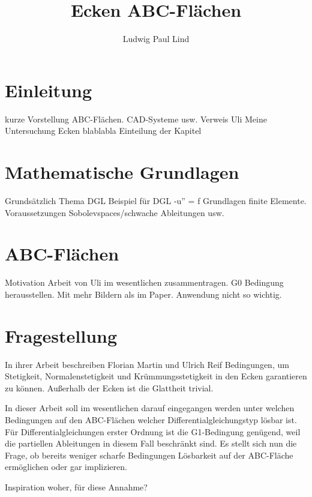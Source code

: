 \documentclass[10pt,a4paper,oneside]{report}
\author{Ludwig Paul Lind}
\title{Ecken ABC-Flächen}
\begin{document}
\maketitle
\tableofcontents

\chapter{Einleitung}
kurze Vorstellung ABC-Flächen. CAD-Systeme usw. 
Verweis Uli
Meine Untersuchung Ecken blablabla
Einteilung der Kapitel

\chapter{Mathematische Grundlagen}
Grundsätzlich Thema DGL
Beispiel für DGL -u'' = f
Grundlagen finite Elemente.
Voraussetzungen
Sobolevspaces/schwache Ableitungen usw.

\chapter{ABC-Flächen}
Motivation
Arbeit von Uli im wesentlichen zusammentragen.
G0 Bedingung herausstellen. 
Mit mehr Bildern als im Paper.
Anwendung nicht so wichtig.

\chapter{Fragestellung}
In ihrer Arbeit beschreiben Florian Martin und Ulrich Reif Bedingungen, um Stetigkeit, Normalenstetigkeit und Krümmungsstetigkeit in den Ecken garantieren zu können.
Außerhalb der Ecken ist die Glattheit trivial.

In dieser Arbeit soll im wesentlichen darauf eingegangen werden unter welchen Bedingungen auf den ABC-Flächen welcher Differentialgleichungstyp lösbar ist.
Für Differentialgleichungen erster Ordnung ist die G1-Bedingung genügend, weil die partiellen Ableitungen in diesem Fall beschränkt sind.
Es stellt sich nun die Frage, ob bereits weniger scharfe Bedingungen Lösbarkeit auf der ABC-Fläche ermöglichen oder gar implizieren.

Inspiration woher, für diese Annahme?
\end{document}
